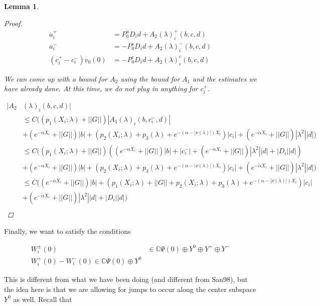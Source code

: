 \documentclass[12pt]{article}
\def\C{{\mathbb C}}
\newtheorem{lemma}{Lemma}
\begin{document}
\begin{lemma}
\begin{proof}
\begin{align*}
a_i^+ &= P^u_0 D_i d + A_2(\lambda)_i^+(b, c, d) \\
a_i^- &= -P^s_0 D_i d + A_2(\lambda)_i^-(b, c, d) \\
(c_i^+ - c_i^-)v_0(0) &= -P^c_0 D_i d + A_2(\lambda)_i^c(b, c, d)
\end{align*}

We can come up with a bound for $A_2$ using the bound for $A_1$ and the estimates we have already done. At this time, we do not plug in anything for $c_i^+$.

\begin{align*}
|A_2&(\lambda)_i(b, c, d)| \\
&\leq C \Big( (p_1(X_i; \lambda) + ||G|| )|A_1(\lambda)_i(b, c_i^-, d)| \\
&+ (e^{-\alpha X_i} + ||G||)|b| + (p_2(X_i; \lambda) + p_3(\lambda) + e^{-(\alpha - |\nu(\lambda)|)X_i})|c_i| + (e^{-\tilde{\alpha} X_i} + ||G||) |\lambda^2| |d| \Big) \\
&\leq C \Big( (p_1(X_i; \lambda) + ||G|| )( (e^{-\alpha X_i} + ||G||) |b| + |c_i^-|
+ (e^{-\tilde{\alpha} X_i} + ||G||) |\lambda^2| |d| + |D_i||d| ) \\
&+ (e^{-\alpha X_i} + ||G||)|b| + (p_2(X_i; \lambda) + p_3(\lambda) + e^{-(\alpha - |\nu(\lambda)|)X_i})|c_i| + (e^{-\tilde{\alpha} X_i} + ||G||) |\lambda^2| |d| \Big) \\
&\leq C \Big( (e^{-\alpha X_i} + ||G||)|b| + (p_1(X_i; \lambda) + ||G|| + p_2(X_i; \lambda) + p_3(\lambda) + e^{-(\alpha - |\nu(\lambda)|)X_i})|c_i| \\
&+ (e^{-\tilde{\alpha} X_i} + ||G||) |\lambda^2| |d| + |D_i||d|\Big) \\
\end{align*}

\end{proof}
\end{lemma}

Finally, we want to satisfy the conditions

\begin{align*}
W_i^\pm(0) &\in \C \Psi(0) \oplus Y^0 \oplus Y^+ \oplus Y^- \\
W_i^+(0) - W_i^-(0) \in \C \Psi(0) \oplus Y^0
\end{align*}

This is different from what we have been doing (and different from San98), but the idea here is that we are allowing for jumps to occur along the center subspace $Y^0$ as well. Recall that
\end{document}
